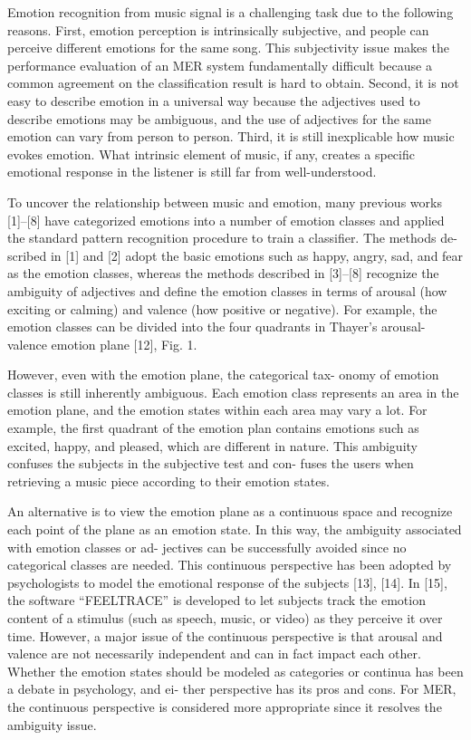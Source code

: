 \documentclass[journal, twoside]{IEEEtran}
\begin{document}
Emotion recognition from music signal is a challenging task
due to the following reasons. First, emotion perception is intrinsically subjective, and people can perceive different emotions for the same song. This subjectivity issue makes the performance evaluation of an MER system fundamentally difficult because a common agreement on the classification result is hard to
obtain. Second, it is not easy to describe emotion in a universal
way because the adjectives used to describe emotions may be
ambiguous, and the use of adjectives for the same emotion can
vary from person to person. Third, it is still inexplicable how
music evokes emotion. What intrinsic element of music, if any,
creates a specific emotional response in the listener is still far
from well-understood.

To uncover the relationship between music and emotion,
many previous works [1]–[8] have categorized emotions into
a number of emotion classes and applied the standard pattern
recognition procedure to train a classifier. The methods de-
scribed in [1] and [2] adopt the basic emotions such as happy,
angry, sad, and fear as the emotion classes, whereas the methods
described in [3]–[8] recognize the ambiguity of adjectives and
define the emotion classes in terms of arousal (how exciting or
calming) and valence (how positive or negative). For example,
the emotion classes can be divided into the four quadrants in
Thayer’s arousal-valence emotion plane [12], Fig. 1.

However, even with the emotion plane, the categorical tax-
onomy of emotion classes is still inherently ambiguous. Each
emotion class represents an area in the emotion plane, and the
emotion states within each area may vary a lot. For example,
the first quadrant of the emotion plan contains emotions such as
excited, happy, and pleased, which are different in nature. This
ambiguity confuses the subjects in the subjective test and con-
fuses the users when retrieving a music piece according to their
emotion states.%



\IEEEpubidadjcol
An alternative is to view the emotion plane as a continuous
space and recognize each point of the plane as an emotion state.
In this way, the ambiguity associated with emotion classes or ad-
jectives can be successfully avoided since no categorical classes
are needed. This continuous perspective has been adopted by
psychologists to model the emotional response of the subjects
[13], [14]. In [15], the software “FEELTRACE” is developed
to let subjects track the emotion content of a stimulus (such as
speech, music, or video) as they perceive it over time. However,
a major issue of the continuous perspective is that arousal and
valence are not necessarily independent and can in fact impact
each other. Whether the emotion states should be modeled as
categories or continua has been a debate in psychology, and ei-
ther perspective has its pros and cons. For MER, the continuous
perspective is considered more appropriate since it resolves the
ambiguity issue.
\IEEEpubidadjcol
\end{document}
